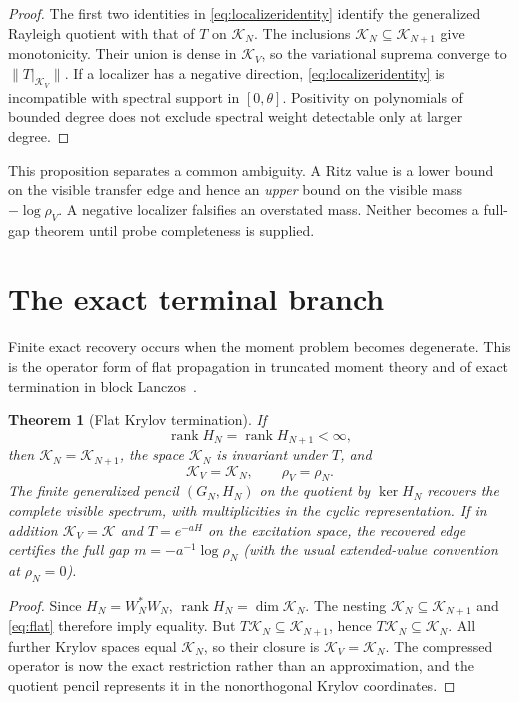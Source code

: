 \documentclass[11pt]{article}
\newtheorem{theorem}{Theorem}[section]
\theoremstyle{definition}
\theoremstyle{remark}
\newcommand{\K}{\mathcal K}
\newcommand{\rank}{\operatorname{rank}}
\begin{document}
\begin{proof}
The first two identities in \cref{eq:localizeridentity} identify the
generalized Rayleigh quotient with that of $T$ on $\K_N$.  The inclusions
$\K_N\subseteq\K_{N+1}$ give monotonicity.  Their union is dense in $\K_V$,
so the variational suprema converge to $\|T|_{\K_V}\|$.  If a localizer has a
negative direction, \cref{eq:localizeridentity} is incompatible with spectral
support in $[0,\theta]$.  Positivity on polynomials of bounded degree does not
exclude spectral weight detectable only at larger degree.
\end{proof}

This proposition separates a common ambiguity.  A Ritz value is a lower bound
on the visible transfer edge and hence an \emph{upper} bound on the visible
mass $-\log\rho_V$.  A negative localizer falsifies an overstated mass.  Neither
becomes a full-gap theorem until probe completeness is supplied.

\section{The exact terminal branch}

Finite exact recovery occurs when the moment problem becomes degenerate.
This is the operator form of flat propagation in truncated moment theory and
of exact termination in block Lanczos~\cite{CurtoMatrix2022,CurtoExtremal2006,Madler2023,FilteredRR}.

\begin{theorem}[Flat Krylov termination]                \label{thm:flat}
If
\begin{equation}
  \rank H_N=\rank H_{N+1}<\infty,                      \label{eq:flat}
\end{equation}
then $\K_N=\K_{N+1}$, the space $\K_N$ is invariant under $T$, and
\begin{equation}
  \K_V=\K_N,\qquad \rho_V=\rho_N.                     \label{eq:terminaledge}
\end{equation}
The finite generalized pencil $(G_N,H_N)$ on the quotient by $\ker H_N$
recovers the complete visible spectrum, with multiplicities in the cyclic
representation.  If in addition $\K_V=\K$ and $T=e^{-aH}$ on the excitation
space, the recovered edge certifies the full gap
$m=-a^{-1}\log\rho_N$ (with the usual extended-value convention at
$\rho_N=0$).
\end{theorem}

\begin{proof}
Since $H_N=W_N^*W_N$, $\rank H_N=\dim\K_N$.  The nesting
$\K_N\subseteq\K_{N+1}$ and \cref{eq:flat} therefore imply equality.  But
$T\K_N\subseteq\K_{N+1}$, hence $T\K_N\subseteq\K_N$.  All further Krylov
spaces equal $\K_N$, so their closure is $\K_V=\K_N$.  The compressed operator
is now the exact restriction rather than an approximation, and the quotient
pencil represents it in the nonorthogonal Krylov coordinates.
\end{proof}
\end{document}
